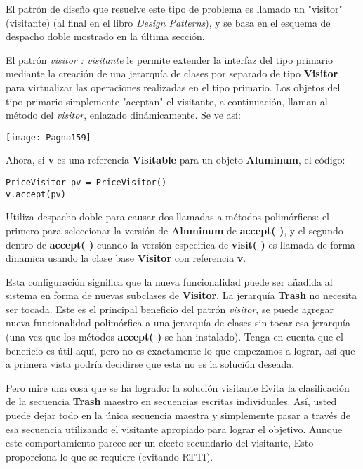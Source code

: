 El patrón de diseño que resuelve este tipo de problema es llamado un "visitor" (visitante) (al final en el libro \textit{Design Patterns}), y se basa en el esquema de despacho doble mostrado en la última sección. \newline

El patrón \textit{visitor : visitante} le permite extender la interfaz del tipo primario mediante la creación de una jerarquía de clases por separado de tipo \textbf{Visitor} para virtualizar las operaciones realizadas en el tipo primario. Los objetos del tipo primario simplemente "aceptan" el visitante, a continuación, llaman al método del \textit{visitor}, enlazado dinámicamente. Se ve así:       \newline

\texttt{[image: Pagna159]}

Ahora, si \textbf{v} es una referencia \textbf{Visitable} para un objeto \textbf{Aluminum}, el código:    \newline

\begin{lstlisting} 
PriceVisitor pv = PriceVisitor() 
v.accept(pv) 
\end{lstlisting}

Utiliza despacho doble para causar dos llamadas a métodos polimórficos: el primero para seleccionar la versión de \textbf{Aluminum} de \textbf{accept( )}, y el segundo dentro de \textbf{accept( )} cuando la versión especifica de \textbf{visit( )} es llamada de forma dinamica usando la clase base \textbf{Visitor} con referencia \textbf{v}.         \newline

Esta configuración significa que la nueva funcionalidad puede ser añadida al sistema en forma de nuevas subclases de \textbf{Visitor}. La jerarquía \textbf{Trash} no necesita ser tocada. Este es el principal beneficio del patrón \textit{visitor}, se puede agregar nueva funcionalidad polimórfica a una jerarquía de clases sin tocar esa jerarquía (una vez que los métodos \textbf{accept( )} se han instalado). Tenga en cuenta que el beneficio es útil aquí, pero no es exactamente lo que empezamos a lograr, así que a primera vista podría decidirse que esta no es la solución deseada.      \newline

Pero mire una cosa que se ha logrado: la solución visitante Evita la clasificación de la secuencia \textbf{Trash} maestro en secuencias escritas individuales. Así, usted puede dejar todo en la única secuencia maestra y simplemente pasar a través de esa secuencia utilizando el visitante apropiado para lograr el objetivo. Aunque este comportamiento parece ser un efecto secundario del visitante, Esto proporciona lo que se requiere (evitando RTTI).       \newline

